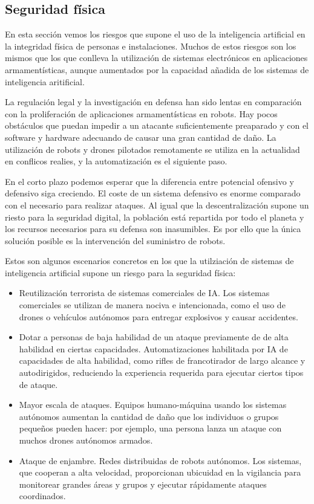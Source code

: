 \documentclass[12pt,a4paper]{article}
\begin{document}
\subsection{Seguridad física}

En esta sección vemos los riesgos que supone el uso de la inteligencia artificial en la integridad física de personas e instalaciones. Muchos de estos riesgos son los mismos que los que conlleva la utilización de sistemas electrónicos en aplicaciones armamentísticas, aunque aumentados por la capacidad añadida de los sistemas de inteligencia aritificial.

La regulación legal y la investigación en defensa han sido lentas en comparación con la proliferación de aplicaciones armamentísticas en robots. Hay pocos obstáculos que puedan impedir a un atacante suficientemente preaparado y con el software y hardware adecuando de causar una gran cantidad de daño. La utilización de robots y drones pilotados remotamente se utiliza en la actualidad en conflicos realies, y la automatización es el siguiente paso.

En el corto plazo podemos esperar que la diferencia entre potencial ofensivo y defensivo siga creciendo. El coste de un sistema defensivo es enorme comparado con el necesario para realizar ataques. Al igual que la descentralización supone un riesto para la seguridad digital, la población está repartida por todo el planeta y los recursos necesarios para su defensa son inasumibles. Es por ello que la única solución posible es la intervención del suministro de robots.

Estos son algunos escenarios concretos en los que la utilziación de sistemas de inteligencia artificial supone un riesgo para la seguridad física:

\begin{itemize}

\item Reutilización terrorista de sistemas comerciales de IA. Los sistemas comerciales se utilizan de manera nociva e intencionada, como el uso de drones o vehículos autónomos para entregar explosivos y causar accidentes.

\item Dotar a personas de baja habilidad de un ataque previamente de de alta habilidad en ciertas capacidades. Automatizaciones habilitada por IA de capacidades de alta habilidad, como rifles de francotirador de largo alcance y autodirigidos, reduciendo la experiencia requerida para ejecutar ciertos tipos de ataque.

\item Mayor escala de ataques. Equipos humano-máquina usando los sistemas autónomos aumentan la cantidad de daño que los individuos o grupos pequeños pueden hacer: por ejemplo, una persona lanza un ataque con muchos drones autónomos armados.

\item Ataque de enjambre. Redes distribuidas de robots autónomos. Los sistemas, que cooperan a alta velocidad, proporcionan ubicuidad en la vigilancia para monitorear grandes áreas y grupos y ejecutar rápidamente ataques coordinados.

\end {itemize}
\end{document}
